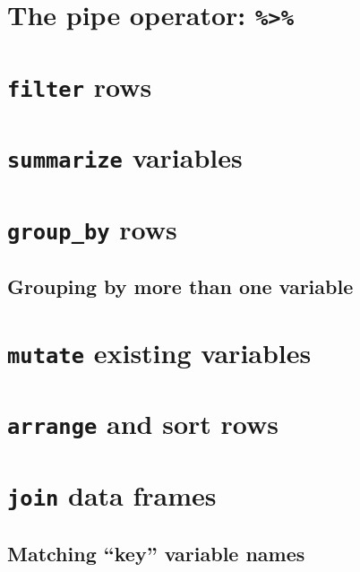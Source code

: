 \documentclass[12pt, krantz2,]{krantz}
\begin{document}
\hypertarget{piping}{%
\section{\texorpdfstring{The pipe operator: \texttt{\%\textgreater{}\%}}{The pipe operator: \%\textgreater{}\%}}\label{piping}}

\hypertarget{filter}{%
\section{\texorpdfstring{\texttt{filter} rows}{filter rows}}\label{filter}}

\hypertarget{summarize}{%
\section{\texorpdfstring{\texttt{summarize} variables}{summarize variables}}\label{summarize}}

\hypertarget{groupby}{%
\section{\texorpdfstring{\texttt{group\_by} rows}{group\_by rows}}\label{groupby}}

\hypertarget{grouping-by-more-than-one-variable}{%
\subsection{Grouping by more than one variable}\label{grouping-by-more-than-one-variable}}

\hypertarget{mutate}{%
\section{\texorpdfstring{\texttt{mutate} existing variables}{mutate existing variables}}\label{mutate}}

\hypertarget{arrange}{%
\section{\texorpdfstring{\texttt{arrange} and sort rows}{arrange and sort rows}}\label{arrange}}

\hypertarget{joins}{%
\section{\texorpdfstring{\texttt{join} data frames}{join data frames}}\label{joins}}

\hypertarget{matching-key-variable-names}{%
\subsection{Matching ``key'' variable names}\label{matching-key-variable-names}}
\end{document}
